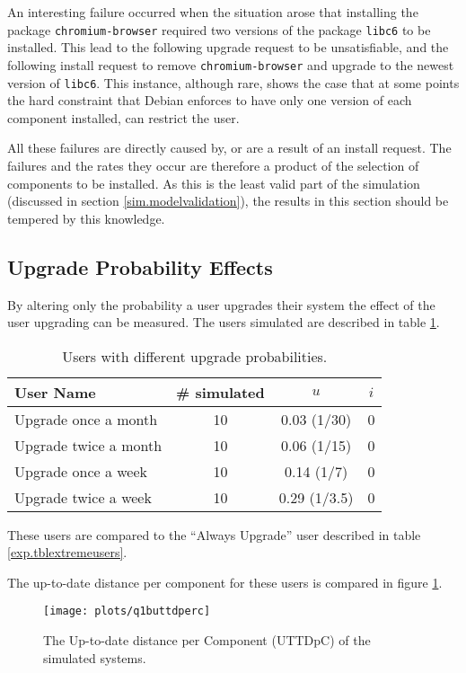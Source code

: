 An interesting failure occurred when the situation arose that installing the package \texttt{chromium-browser} required two versions of the package \texttt{libc6} to be installed. 
This lead to the following upgrade request to be unsatisfiable, and the following install request to remove \texttt{chromium-browser} and upgrade to the newest version of \texttt{libc6}.
This instance, although rare, shows the case that at some points the hard constraint that Debian enforces to have only one version of each component installed,
can restrict the user.

All these failures are directly caused by, or are a result of an install request.
The failures and the rates they occur are therefore a product of the selection of components to be installed.
As this is the least valid part of the simulation (discussed in section \ref{sim.modelvalidation}), the results in this section should be tempered by this knowledge. 


\subsection{Upgrade Probability Effects}
By altering only the probability a user upgrades their system the effect of the user upgrading can be measured.
The users simulated are described in table \ref{exp.tblq1busers}.
\begin{table}[h!]
\centering
\begin{tabular}{|l | c | c | c |}
\hline
User Name 				& \# simulated 	& $u$ 		& $i$ 			\\ \hline
Upgrade once a month	& 10 			& 0.03 (1/30)			& 0				 \\
Upgrade twice a month	& 10 			& 0.06 (1/15)		& 0				\\
Upgrade once a week		& 10 			& 0.14 (1/7)		& 0				 \\
Upgrade twice a week 	& 10 			& 0.29 (1/3.5)		& 0				\\ \hline
\end{tabular}
\caption{Users with different upgrade probabilities.}
\label{exp.tblq1busers}
\end{table}
These users are compared to the ``Always Upgrade'' user described in table \ref{exp.tblextremeusers}.

The up-to-date distance per component for these users is compared in figure \ref{exp.q1buttdperc}.
\begin{figure}[htp]
\begin{center}
  \texttt{[image: plots/q1buttdperc]}
  \caption{The Up-to-date distance per Component (UTTDpC) of the simulated systems.}
  \label{exp.q1buttdperc}
\end{center}
\end{figure}

